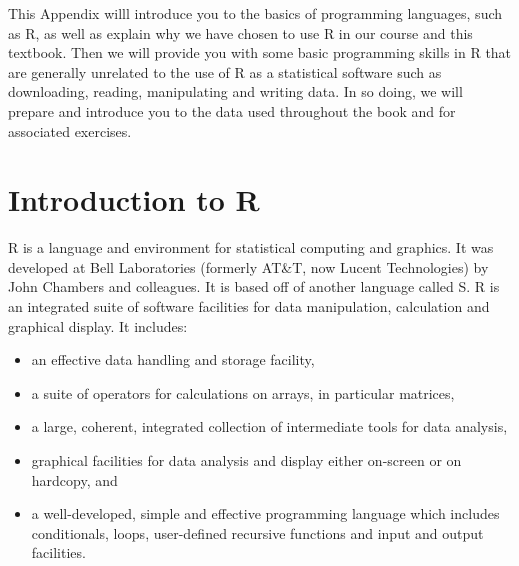 \documentclass[11pt,openany]{book}\usepackage[]{graphicx}\usepackage[]{color}
\begin{document}
This Appendix willl introduce you to the basics of programming languages, such as  R, as well as explain why we have chosen to use R in our course and this textbook. Then we will provide you with some basic programming skills in R that are generally unrelated to the use of R as a statistical software such as downloading, reading, manipulating and writing data. In so doing, we will prepare and introduce you to the data used throughout the book and for associated exercises. 

\section{Introduction to R}

R is a language and environment for statistical computing and graphics. It was developed at Bell Laboratories (formerly AT\&T, now Lucent Technologies) by John Chambers and colleagues. It is based off of another language called S. R is an integrated suite of software facilities for data manipulation, calculation and graphical display. It includes:
\begin{itemize}
\item an effective data handling and storage facility,
\item a suite of operators for calculations on arrays, in particular matrices,
\item a large, coherent, integrated collection of intermediate tools for data analysis,
\item graphical facilities for data analysis and display either on-screen or on hardcopy, and
\item a well-developed, simple and effective programming language which includes conditionals, loops, user-defined recursive functions and input and output facilities.
\end{itemize}
\end{document}

